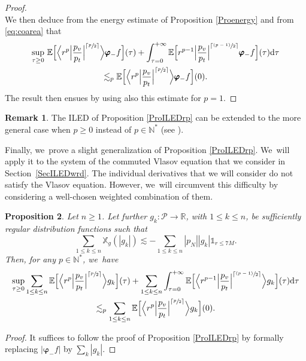 \documentclass[10pt]{amsart}
\newcommand{\psfrac}[2]{\sfrac{(#1)}{#2}}
\theoremstyle{plain}
\newtheorem{proposition}{Proposition}[section]
\theoremstyle{definition}
\newtheorem{remark}[proposition]{Remark}
\newcommand\R{{\mathbb{R}}}
\newcommand\T{{\mathbb{X}}}
\newcommand\dr{{\mathrm{d}}}
\begin{document}
\begin{proof}
\[\]
We then deduce from the energy estimate of Proposition \ref{Proenergy} and from \eqref{eq:coarea} that
\begin{multline*}
\sup_{\tau \geq 0}\, \mathbb{E}\Bigl[ \Big\langle r^{p} \Big|\frac{p_v}{p_t}\Big|^{\lceil \sfrac{p}{2} \rceil} \Big\rangle \pmb{\varphi}_- f \Bigr] (\tau)+\int_{\tau=0}^{+\infty} \mathbb{E}\Bigl[ r^{p-1} \Big|\frac{p_v}{p_t}\Big|^{\lceil \psfrac{p-1}{2} \rceil} \pmb{\varphi}_- f \Bigr] (\tau) \dr \tau \\
\lesssim_p \mathbb{E} \Bigl[ \Big\langle r^{p} \Big|\frac{p_v}{p_t}\Big|^{\lceil \sfrac{p}{2} \rceil} \Big\rangle \pmb{\varphi}_- f \Bigr] (0).
\end{multline*}
The result then ensues by using also this estimate for $p=1$.
\end{proof}

\begin{remark}\label{Rkrpgen}
The ILED of Proposition \ref{ProILEDrp} can be extended to the more general case when $p\geq 0$ instead of $p\in \mathbb{N}^*$ (see \cite[\S 4]{L23}). \end{remark}

Finally, we~prove a slight generalization of Proposition \ref{ProILEDrp}. We~will apply it to the system of the commuted Vlasov equation that we consider in Section~\ref{SecILEDwrd}. The individual derivatives that we will consider do not satisfy the Vlasov equation. However, we~will circumvent this difficulty by considering a well-chosen weighted combination of them.

\begin{proposition}\label{ProILEDrpbis}
Let $ n \geq 1$. Let further $g_k \colon \mathcal{P} \to \R$, with $1 \leq k \leq n$, be sufficiently regular distribution functions such that
\begin{equation}\label{eq:hypgk}
\sum_{1 \leq k \leq n} \T_g (|g_k|) \lesssim -\sum_{1 \leq k \leq n} |p_N| |g_k| \mathds{1}_{r \leq 7M}.
\end{equation}
Then, for any $p \in \mathbb{N}^*$, we~have
\begin{multline*}
\sup_{\tau \geq 0} \sum_{1 \leq k \leq n} \mathbb{E} \Bigl[ \Big\langle r^{p} \Big|\frac{p_v}{p_t}\Big|^{\lceil \sfrac{p}{2} \rceil} \Big\rangle g_k \Bigr] (\tau)+\sum_{1 \leq k \leq n} \int_{\tau=0}^{+\infty} \mathbb{E} \Bigl[ \Big\langle r^{p-1} \Big|\frac{p_v}{p_t}\Big|^{\lceil \psfrac{p-1}{2} \rceil} \Big\rangle g_k \Bigr] (\tau) \dr \tau \\
\lesssim_p \sum_{1 \leq k \leq n} \mathbb{E} \Bigl[ \Big\langle r^{p} \Big|\frac{p_v}{p_t}\Big|^{\lceil \sfrac{p}{2} \rceil} \Big\rangle g_k \Bigr] (0).
\end{multline*}
\end{proposition}
\begin{proof}
It suffices to follow the proof of Proposition \ref{ProILEDrp} by formally replacing $|\pmb{\varphi}_- f|$ by $\sum_k |g_k|$.
\end{proof}
\end{document}
